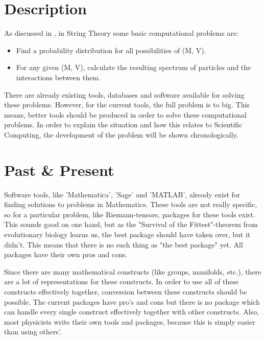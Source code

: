 \documentclass[../paper.tex]{subfiles}
\begin{document}
\section*{Description}
As discussed in \citep{ComputationalExploration}, in String Theory some basic computational problems are:
\begin{itemize}
    \item Find a probability distribution for all possibilities of (M, V).
    \item For any given (M, V), calculate the resulting spectrum of particles and the interactions between them.
\end{itemize}


There are already existing tools, databases and software available for solving these problems. However, for the current tools, the full problem is to big. This means, better tools should be produced in order to solve these computational problems. In order to explain the situation and how this relates to Scientific Computing, the development of the problem will be shown chronologically.


\section*{Past \& Present}
Software tools, like 'Mathematica', 'Sage' and 'MATLAB', already exist for finding solutions to problems in Mathematics. These tools are not really specific, so for a particular problem, like Riemann-tensors, packages for these tools exist. This sounds good on one hand, but as the "Survival of the Fittest"-theorem from evolutionary biology learns us, the best package should have taken over, but it didn't. This means that there is no such thing as "the best package" yet. All packages have their own pros and cons.

Since there are many mathematical constructs (like groups, manifolds, etc.), there are a lot of representations for these constructs. In order to use all of these constructs effectively together, conversion between these constructs should be possible. The current packages have pro's and cons but there is no package which can handle every single construct effectively together with other constructs. Also, most physicists write their own tools and packages, because this is simply easier than using others'. 
\end{document}
